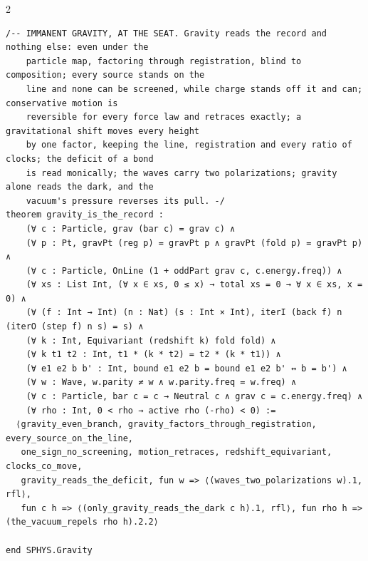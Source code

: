 \documentclass[10pt]{article}
\begin{document}
\begin{multicols}{2}
\begin{Verbatim}[fontsize=\fontsize{5.9}{6.8}\selectfont,breaklines,breakanywhere,breaksymbolleft={}]
/-- IMMANENT GRAVITY, AT THE SEAT. Gravity reads the record and nothing else: even under the
    particle map, factoring through registration, blind to composition; every source stands on the
    line and none can be screened, while charge stands off it and can; conservative motion is
    reversible for every force law and retraces exactly; a gravitational shift moves every height
    by one factor, keeping the line, registration and every ratio of clocks; the deficit of a bond
    is read monically; the waves carry two polarizations; gravity alone reads the dark, and the
    vacuum's pressure reverses its pull. -/
theorem gravity_is_the_record :
    (∀ c : Particle, grav (bar c) = grav c) ∧
    (∀ p : Pt, gravPt (reg p) = gravPt p ∧ gravPt (fold p) = gravPt p) ∧
    (∀ c : Particle, OnLine (1 + oddPart grav c, c.energy.freq)) ∧
    (∀ xs : List Int, (∀ x ∈ xs, 0 ≤ x) → total xs = 0 → ∀ x ∈ xs, x = 0) ∧
    (∀ (f : Int → Int) (n : Nat) (s : Int × Int), iterI (back f) n (iterO (step f) n s) = s) ∧
    (∀ k : Int, Equivariant (redshift k) fold fold) ∧
    (∀ k t1 t2 : Int, t1 * (k * t2) = t2 * (k * t1)) ∧
    (∀ e1 e2 b b' : Int, bound e1 e2 b = bound e1 e2 b' ↔ b = b') ∧
    (∀ w : Wave, w.parity ≠ w ∧ w.parity.freq = w.freq) ∧
    (∀ c : Particle, bar c = c → Neutral c ∧ grav c = c.energy.freq) ∧
    (∀ rho : Int, 0 < rho → active rho (-rho) < 0) :=
  ⟨gravity_even_branch, gravity_factors_through_registration, every_source_on_the_line,
   one_sign_no_screening, motion_retraces, redshift_equivariant, clocks_co_move,
   gravity_reads_the_deficit, fun w => ⟨(waves_two_polarizations w).1, rfl⟩,
   fun c h => ⟨(only_gravity_reads_the_dark c h).1, rfl⟩, fun rho h => (the_vacuum_repels rho h).2.2⟩

end SPHYS.Gravity


\end{Verbatim}
\end{multicols}
\end{document}
